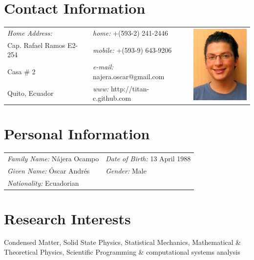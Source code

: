 \documentclass[margin,line]{res}
\begin{document}

\begin{resume}

\section{\sc Contact Information}
  \begin{tabular}{@{}p{2in}p{2.5in}p{3cm} }
    {\it Home Address:}		& {\it home:}  +(593-2) 241-2446 &
      \multirow{4}{*}{ \includegraphics[width=3cm,bb=0 0 500 665]{./foto.jpg}}\\
    Cap. Rafael Ramos E2-254	& {\it mobile:} +(593-9) 643-9206 \\
    Casa \# 2			& {\it e-mail:}  najera.oscar@gmail.com\\
    Quito, Ecuador		& {\it www:} http://titan-c.github.com
  \end{tabular}\vspace{0.5cm}

\section{\sc Personal Information}
 \begin{tabular}{ll}
  {\it Family Name:} Nájera Ocampo & {\it Date of Birth:} 13 April 1988\\
  {\it Given Name:} Óscar Andrés   & {\it Gender:} Male\\
  {\it Nationality:} Ecuadorian    & %
 \end{tabular}

\section{\sc Research Interests}
  Condensed Matter, Solid State Physics, Statistical Mechanics, Mathematical \& Theoretical Physics, Scientific Programming \& computational systems analysis


\end{resume}
\end{document}
